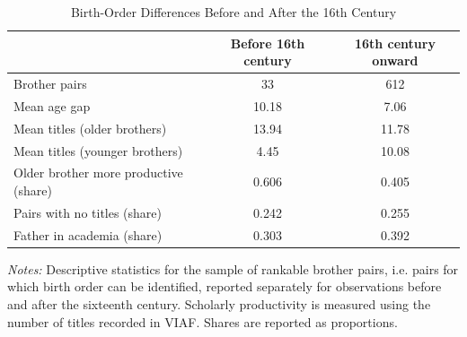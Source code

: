 \begin{table}[H]
\centering
\caption{Birth-Order Differences Before and After the 16th Century}
\label{tab:prepost16}

\begin{tablebody}
\begin{tabular}{l c c}
\toprule
 & \textbf{Before 16th century} & \textbf{16th century onward} \\
\midrule
Brother pairs & 33 & 612 \\
Mean age gap & 10.18 & 7.06 \\
Mean titles (older brothers) & 13.94 & 11.78 \\
Mean titles (younger brothers) & 4.45 & 10.08 \\
Older brother more productive (share) & 0.606 & 0.405 \\
Pairs with no titles (share) & 0.242 & 0.255 \\
Father in academia (share) & 0.303 & 0.392 \\
\bottomrule
\end{tabular}
\end{tablebody}

\vspace{4pt}
\begin{minipage}{\textwidth}
\footnotesize
\textit{Notes:} Descriptive statistics for the sample of rankable brother pairs, i.e. pairs for which birth order can be identified, reported separately for observations before and after the sixteenth century. Scholarly productivity is measured using the number of titles recorded in VIAF. Shares are reported as proportions.
\end{minipage}

\end{table}